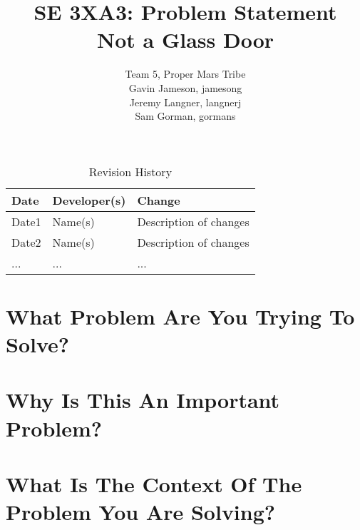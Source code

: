 \documentclass{article}
\title{SE 3XA3: Problem Statement\\Not a Glass Door}
\author{Team 5, Proper Mars Tribe
		\\ Gavin Jameson, jamesong
		\\ Jeremy Langner, langnerj
		\\ Sam Gorman, gormans
}
\date{}
\begin{document}
\begin{table}[hp]
\caption{Revision History} \label{TblRevisionHistory}
\begin{tabularx}{\textwidth}{llX}
\toprule
\textbf{Date} & \textbf{Developer(s)} & \textbf{Change}\\
\midrule
Date1 & Name(s) & Description of changes\\
Date2 & Name(s) & Description of changes\\
... & ... & ...\\
\bottomrule
\end{tabularx}
\end{table}

\newpage

\maketitle

\section*{What Problem Are You Trying To Solve?}
\section*{Why Is This An Important Problem?}
\section*{What Is The Context Of The Problem You Are Solving?}

\iffalse
\wss{comment}

\ds{comment}

\mj{comment}

\cm{comment}

\mh{comment}
\fi
\end{document}
